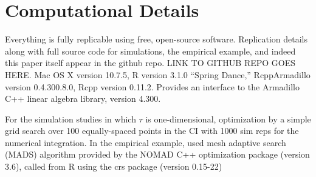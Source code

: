 \section{Computational Details}
\label{append:comp}
Everything is fully replicable using free, open-source software.
Replication details along with full source code for simulations, the empirical example, and indeed this paper itself appear in the github repo.
LINK TO GITHUB REPO GOES HERE.
Mac OS X version 10.7.5, R version 3.1.0 ``Spring Dance,'' RcppArmadillo version 0.4.300.8.0, Rcpp version 0.11.2.
Provides an interface to the Armadillo C++ linear algebra library, version 4.300. 

For the simulation studies in which $\tau$ is one-dimensional, optimization by a simple grid search over 100 equally-spaced points in the CI with 1000 sim reps for the numerical integration.
In the empirical example, used mesh adaptive search (MADS) algorithm provided by the NOMAD C++ optimization package (version 3.6), called from R using the crs package (version 0.15-22)